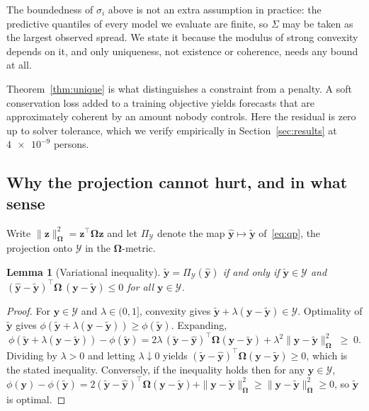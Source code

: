 \documentclass[utf8]{FrontiersinHarvard}
\newif\ifrevisionmarkup
\newcommand{\new}[1]{\ifrevisionmarkup\textcolor{revision}{#1}\else#1\fi}
\theoremstyle{plain}
\newtheorem{lemma}[theorem]{Lemma}
\theoremstyle{definition}
\theoremstyle{remark}
\newcommand{\by}{\bm{y}}
\newcommand{\bOm}{\bm{\Omega}}
\newcommand{\yhat}{\hat{\by}}
\newcommand{\ytil}{\tilde{\by}}
\newcommand{\cY}{\mathcal{Y}}
\begin{document}
\new{The boundedness of $\sigma_i$ above is not an extra assumption in practice: the predictive quantiles of every model we evaluate are finite, so $\Sigma$ may be taken as the largest observed spread. We state it because the modulus of strong convexity depends on it, and only uniqueness, not existence or coherence, needs any bound at all.}

Theorem~\ref{thm:unique} is what distinguishes a constraint from a penalty. A soft conservation loss added to a training objective yields forecasts that are approximately coherent by an amount nobody controls. Here the residual is zero up to solver tolerance, which we verify empirically in Section~\ref{sec:results} at $\num{4e-9}$ persons.

\subsection{Why the projection cannot hurt, and in what sense}

Write $\|\bm{z}\|_{\bOm}^2 = \bm{z}^{\top}\bOm\bm{z}$ and let $\Pi_{\cY}$ denote the map $\yhat \mapsto \ytil$ of~\eqref{eq:qp}, the projection onto $\cY$ in the $\bOm$-metric.

\begin{lemma}[Variational inequality]
\label{lem:vi}
$\ytil = \Pi_{\cY}(\yhat)$ if and only if $\ytil \in \cY$ and
$(\yhat - \ytil)^{\top}\bOm\,(\by - \ytil) \le 0$ for all $\by \in \cY$.
\end{lemma}
\begin{proof}
For $\by \in \cY$ and $\lambda \in (0,1]$, convexity gives $\ytil + \lambda(\by-\ytil) \in \cY$. Optimality of $\ytil$ gives $\phi(\ytil + \lambda(\by-\ytil)) \ge \phi(\ytil)$. Expanding,
\[
\phi(\ytil+\lambda(\by-\ytil)) - \phi(\ytil)
= 2\lambda\,(\ytil-\yhat)^{\top}\bOm(\by-\ytil) + \lambda^{2}\|\by-\ytil\|_{\bOm}^{2} \;\ge\; 0 .
\]
Dividing by $\lambda>0$ and letting $\lambda \downarrow 0$ yields $(\ytil-\yhat)^{\top}\bOm(\by-\ytil) \ge 0$, which is the stated inequality. Conversely, if the inequality holds then for any $\by \in \cY$,
$\phi(\by) - \phi(\ytil) = 2(\ytil-\yhat)^{\top}\bOm(\by-\ytil) + \|\by-\ytil\|_{\bOm}^{2} \ge \|\by-\ytil\|_{\bOm}^{2} \ge 0$,
so $\ytil$ is optimal.
\end{proof}
\end{document}
